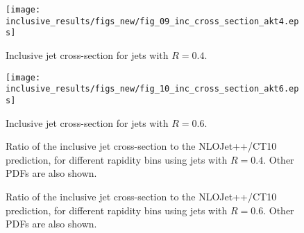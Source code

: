 \begin{figure}
\begin{centering}
\texttt{[image: inclusive\_results/figs\_new/fig\_09\_inc\_cross\_section\_akt4.eps]}
\caption[Inclusive jet cross-section, $R$= 0.4]{Inclusive jet cross-section for \akt jets with $R = 0.4$.}
\label{result_incjet_xsec_4}
\end{centering}
\end{figure}

\begin{figure}
\begin{centering}
\texttt{[image: inclusive\_results/figs\_new/fig\_10\_inc\_cross\_section\_akt6.eps]}
\caption[Inclusive jet cross-section, $R$= 0.6]{Inclusive jet cross-section for \akt jets with $R = 0.6$.}
\label{result_incjet_xsec_6}
\end{centering}
\end{figure}


\begin{figure}[tbp]
\begin{centering}
\caption[Data/theory cross-section ratio, $R$= 0.4]{Ratio of the inclusive jet cross-section to the NLOJet++/CT10 prediction, for different rapidity bins using \akt jets with $R=0.4$. Other PDFs are also shown.} 
\label{fig_xsec_rat_akt4}
\end{centering}
\end{figure}

\begin{figure}[tbp]
\begin{centering}
\caption[Data/theory cross-section ratio, $R$= 0.6]{Ratio of the inclusive jet cross-section to the NLOJet++/CT10 prediction, for different rapidity bins using \akt jets with $R=0.6$. Other PDFs are also shown.}
\label{fig_xsec_rat_akt6}
\end{centering}
\end{figure}

